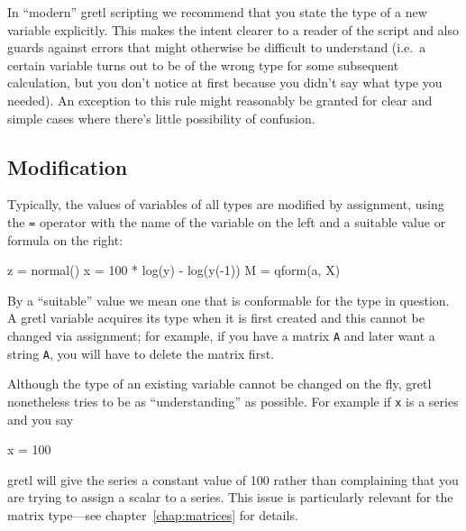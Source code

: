In ``modern'' gretl scripting we recommend that you state the
type of a new variable explicitly. This makes the intent clearer to a
reader of the script and also guards against errors that might
otherwise be difficult to understand (i.e.\ a certain variable turns
out to be of the wrong type for some subsequent calculation, but you
don't notice at first because you didn't say what type you needed). An
exception to this rule might reasonably be granted for clear and
simple cases where there's little possibility of confusion.

\subsection{Modification}

Typically, the values of variables of all types are modified
by assignment, using the \texttt{=} operator with the name of the
variable on the left and a suitable value or formula on the right:

\begin{code}
z = normal()
x = 100 * log(y) - log(y(-1))
M = qform(a, X)
\end{code}

By a ``suitable'' value we mean one that is conformable for the type
in question. A gretl variable acquires its type when it is first
created and this cannot be changed via assignment; for example, if you
have a matrix \texttt{A} and later want a string \texttt{A}, you will
have to delete the matrix first.


Although the type of an existing variable cannot be changed on the
fly, gretl nonetheless tries to be as ``understanding'' as
possible. For example if \texttt{x} is a series and you say

\begin{code}
x = 100
\end{code} 

gretl will give the series a constant value of 100 rather than
complaining that you are trying to assign a scalar to a series. This
issue is particularly relevant for the matrix type---see
chapter~\ref{chap:matrices} for details.

